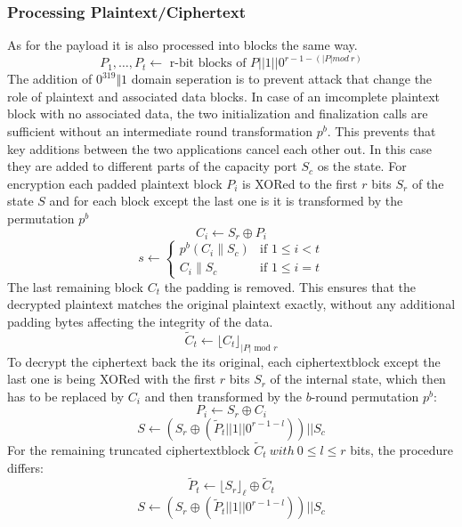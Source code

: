 \subsubsection{Processing Plaintext/Ciphertext}
As for the payload it is also processed into blocks the same way. 
$$P_1, \dots , P_t \leftarrow \text{ r-bit blocks of } P || 1 || 0^{r-1-(|P| mod\ r)}$$
The addition of $0^{319} \Vert 1$ domain seperation is to prevent attack that change the role of plaintext and associated data blocks. In case of an imcomplete plaintext block with no associated data, the two initialization and finalization calls are sufficient without an intermediate round transformation $p^b$. This prevents that key additions between the two applications cancel each other out. In this case they are added to different parts of the capacity port $S_c$ os the state. \cite[Chapter 5.1.1]{DBLP:journals/joc/DobraunigEMS21} \newline
For encryption each padded plaintext block $P_i$ is XORed to the first $r$ bits $S_r$ of the state $S$ and for each block except the last one is it is transformed by the permutation $p^b$%
$$C_i \leftarrow S_r \oplus P_i$$
$$
s \leftarrow \begin{cases} 
    p^b(C_i \parallel S_c) & \text{if } 1 \leq i < t \\
    C_i \parallel S_c & \text{if } 1 \leq i = t
    \end{cases}
$$
The last remaining block $C_t$ the padding is removed. This ensures that the decrypted plaintext matches the original plaintext exactly, without any additional padding bytes affecting the integrity of the data.
$$\tilde{C}_t \leftarrow \lfloor C_t \rfloor_{|P| \text{ mod } r}$$
\newline
To decrypt the ciphertext back the its original, each ciphertextblock except the last one is being XORed with the first $r$ bits $S_r$ of the internal state, which then has to be replaced by $C_i$ and then transformed by the $b$-round permutation $p^b$:
$$ P_i\leftarrow S_r \oplus C_i $$
$$ S \leftarrow (S_r \oplus (\tilde P_t || 1 || 0^{r-1-l})) || S_c $$
For the remaining truncated ciphertextblock $\tilde C_t\ with\ 0 \leq l \le r$ bits, the procedure differs:
$$\tilde{P}_t \leftarrow \lfloor S_r \rfloor_\ell \oplus \tilde{C}_t$$
$$S \leftarrow (S_r \oplus (\tilde P_t || 1 || 0^{r-1-l})) || S_c$$
\cite{DBLP:journals/joc/DobraunigEMS21}

